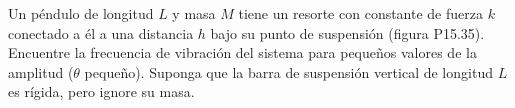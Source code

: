 \item Un péndulo de longitud $L$ y masa $M$ tiene un resorte con constante de fuerza $k$ conectado a él a una distancia $h$ bajo su punto de suspensión (figura P15.35). Encuentre la frecuencia de vibración del sistema para pequeños valores de la amplitud ($\theta$ pequeño). Suponga que la barra de suspensión vertical de longitud $L$ es rígida, pero ignore su masa.